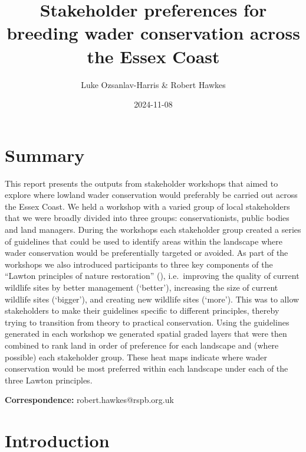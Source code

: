 \documentclass[
  12pt,
  letterpaper,
  DIV=11,
  numbers=noendperiod]{scrartcl}
\title{Stakeholder preferences for breeding wader conservation across
the Essex Coast}
\author{Luke Ozsanlav-Harris \& Robert Hawkes}
\date{2024-11-08}
\begin{document}
\maketitle


\section{Summary}\label{summary}

This report presents the outputs from stakeholder workshops that aimed
to explore where lowland wader conservation would preferably be carried
out across the Essex Coast. We held a workshop with a varied group of
local stakeholders that we were broadly divided into three groups:
conservationists, public bodies and land managers. During the workshops
each stakeholder group created a series of guidelines that could be used
to identify areas within the landscape where wader conservation would be
preferentially targeted or avoided. As part of the workshops we also
introduced participants to three key components of the ``Lawton
principles of nature restoration'' (), i.e.~improving the quality of current wildlife sites by
better management (`better'), increasing the size of current wildlife
sites (`bigger'), and creating new wildlife sites (`more'). This was to
allow stakeholders to make their guidelines specific to different
principles, thereby trying to transition from theory to practical
conservation. Using the guidelines generated in each workshop we
generated spatial graded layers that were then combined to rank land in
order of preference for each landscape and (where possible) each
stakeholder group. These heat maps indicate where wader conservation
would be most preferred within each landscape under each of the three
Lawton principles.

\textbf{Correspondence:} robert.hawkes@rspb.org.uk

\newpage{}

\section{Introduction}\label{introduction}
\end{document}
